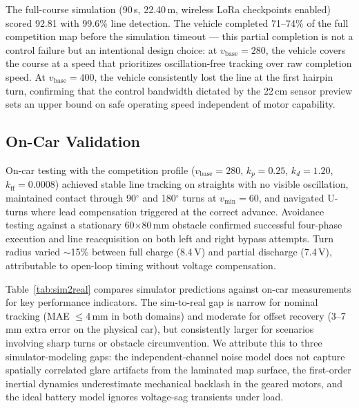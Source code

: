 \documentclass[letterpaper,journal]{IEEEtran}
\begin{document}
The full-course simulation (90\,s, 22.40\,m, wireless LoRa checkpoints enabled) scored 92.81 with 99.6\% line detection. The vehicle completed 71--74\% of the full competition map before the simulation timeout --- this partial completion is not a control failure but an intentional design choice: at $v_{\text{base}}=280$, the vehicle covers the course at a speed that prioritizes oscillation-free tracking over raw completion speed. At $v_{\text{base}}=400$, the vehicle consistently lost the line at the first hairpin turn, confirming that the control bandwidth dictated by the 22\,cm sensor preview sets an upper bound on safe operating speed independent of motor capability.

\subsection{On-Car Validation}

On-car testing with the competition profile ($v_{\text{base}}=280$, $k_p=0.25$, $k_d=1.20$, $k_{\text{ff}}=0.0008$) achieved stable line tracking on straights with no visible oscillation, maintained contact through 90$^\circ$ and 180$^\circ$ turns at $v_{\text{min}}=60$, and navigated U-turns where lead compensation triggered at the correct advance. Avoidance testing against a stationary 60$\times$80\,mm obstacle confirmed successful four-phase execution and line reacquisition on both left and right bypass attempts. Turn radius varied $\sim$15\% between full charge (8.4\,V) and partial discharge (7.4\,V), attributable to open-loop timing without voltage compensation.

Table~\ref{tab:sim2real} compares simulator predictions against on-car measurements for key performance indicators. The sim-to-real gap is narrow for nominal tracking (MAE $\leq$4\,mm in both domains) and moderate for offset recovery (3--7\,mm extra error on the physical car), but consistently larger for scenarios involving sharp turns or obstacle circumvention. We attribute this to three simulator-modeling gaps: the independent-channel noise model does not capture spatially correlated glare artifacts from the laminated map surface, the first-order inertial dynamics underestimate mechanical backlash in the geared motors, and the ideal battery model ignores voltage-sag transients under load.
\end{document}
